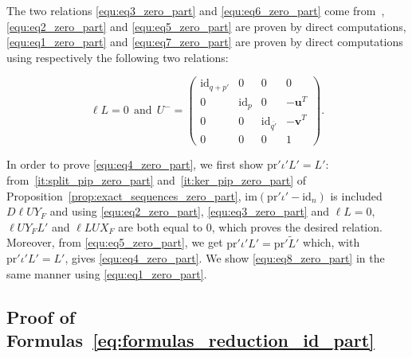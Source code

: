 \documentclass{ifacconf}
\newcommand\g[1]{\textbf{#1}}
\newcommand\id[1]{\text{id}_{#1}}
\newcommand\im{\text{im}}
\newcommand\p{\text{pr}}
\begin{document}
The two relations \eqref{equ:eq3_zero_part} and \eqref{equ:eq6_zero_part}
come from~\cite{ClQu:11}, \eqref{equ:eq2_zero_part} and
\eqref{equ:eq5_zero_part} are proven by direct computations,
\eqref{equ:eq1_zero_part} and \eqref{equ:eq7_zero_part} are proven by
direct computations using respectively the following two relations:
\begin{small}
  \[\ell L=0\ \ \text{and}\ \
  U^-=\begin{pmatrix}
  \id{q+p'} & 0 & 0 & 0\\
  0 & \id{p} & 0 & -\g{u}^T\\
  0 & 0 & \id{\overline{q'}} & -\g{v}^T\\
  0 & 0 & 0 & 1
  \end{pmatrix}.\]
\end{small}

In order to prove \eqref{equ:eq4_zero_part}, we first show $\p'\iota'L'=
L'$: from~\ref{it:split_pip_zero_part} and~\ref{it:ker_pip_zero_part} of
Proposition~\ref{prop:exact_sequences_zero_part}, $\im(\p'\iota'-\id{n})
$ is included $D\ell UY_F$ and using \eqref{equ:eq2_zero_part},
\eqref{equ:eq3_zero_part} and $\ell L=0$, $\ell UY_FL'$ and $\ell LUX_F$
are both equal to $0$, which proves the desired relation. Moreover, from
\eqref{equ:eq5_zero_part}, we get $\p'\iota'L'=\p'\tilde{L}'$ which,
with $\p'\iota'L'=L'$, gives \eqref{equ:eq4_zero_part}. We show
\eqref{equ:eq8_zero_part} in the same manner using
\eqref{equ:eq1_zero_part}.

\subsection{Proof of Formulas~\eqref{eq:formulas_reduction_id_part}}
\label{sec:proofs_reduction_id_part}
\end{document}
